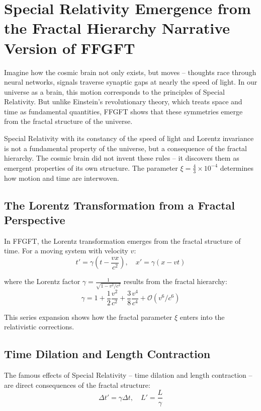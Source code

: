 \chapter{Special Relativity  Emergence from the Fractal Hierarchy  Narrative Version of FFGFT}



Imagine how the cosmic brain not only exists, but moves -- thoughts race through neural networks, signals traverse synaptic gaps at nearly the speed of light. In our universe as a brain, this motion corresponds to the principles of Special Relativity. But unlike Einstein's revolutionary theory, which treats space and time as fundamental quantities, FFGFT shows that these symmetries emerge from the fractal structure of the universe.

Special Relativity with its constancy of the speed of light and Lorentz invariance is not a fundamental property of the universe, but a consequence of the fractal hierarchy. The cosmic brain did not invent these rules -- it discovers them as emergent properties of its own structure. The parameter $\xi = \frac{4}{3} \times 10^{-4}$ determines how motion and time are interwoven.

\section{The Lorentz Transformation from a Fractal Perspective}

In FFGFT, the Lorentz transformation emerges from the fractal structure of time. For a moving system with velocity $v$:
\begin{equation}
t' = \gamma(t - \frac{vx}{c^2}), \quad x' = \gamma(x - vt)
\end{equation}

where the Lorentz factor $\gamma = \frac{1}{\sqrt{1 - v^2/c^2}}$ results from the fractal hierarchy:
\begin{equation}
\gamma = 1 + \frac{1}{2}\frac{v^2}{c^2} + \frac{3}{8}\frac{v^4}{c^4} + \mathcal{O}(v^6/c^6)
\end{equation}

This series expansion shows how the fractal parameter $\xi$ enters into the relativistic corrections.

\section{Time Dilation and Length Contraction}

The famous effects of Special Relativity -- time dilation and length contraction -- are direct consequences of the fractal structure:
\begin{equation}
\Delta t' = \gamma \Delta t, \quad L' = \frac{L}{\gamma}
\end{equation}

